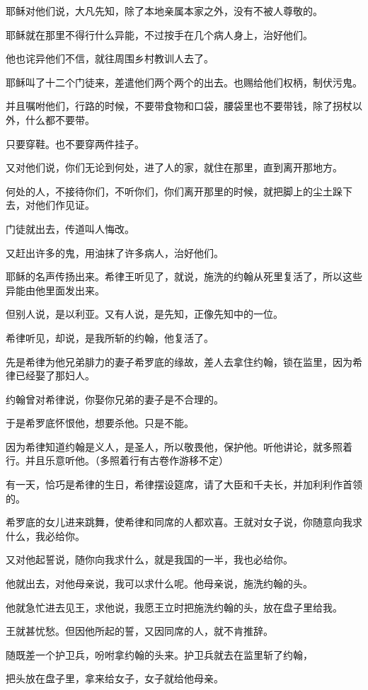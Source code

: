 \documentclass[12pt,oneside]{book}
\begin{document}
耶稣对他们说，大凡先知，除了本地亲属本家之外，没有不被人尊敬的。

耶稣就在那里不得行什么异能，不过按手在几个病人身上，治好他们。

他也诧异他们不信，就往周围乡村教训人去了。

耶稣叫了十二个门徒来，差遣他们两个两个的出去。也赐给他们权柄，制伏污鬼。

并且嘱咐他们，行路的时候，不要带食物和口袋，腰袋里也不要带钱，除了拐杖以外，什么都不要带。

只要穿鞋。也不要穿两件挂子。

又对他们说，你们无论到何处，进了人的家，就住在那里，直到离开那地方。

何处的人，不接待你们，不听你们，你们离开那里的时候，就把脚上的尘土跺下去，对他们作见证。

门徒就出去，传道叫人悔改。

又赶出许多的鬼，用油抹了许多病人，治好他们。

耶稣的名声传扬出来。希律王听见了，就说，施洗的约翰从死里复活了，所以这些异能由他里面发出来。

但别人说，是以利亚。又有人说，是先知，正像先知中的一位。

希律听见，却说，是我所斩的约翰，他复活了。

先是希律为他兄弟腓力的妻子希罗底的缘故，差人去拿住约翰，锁在监里，因为希律已经娶了那妇人。

约翰曾对希律说，你娶你兄弟的妻子是不合理的。

于是希罗底怀恨他，想要杀他。只是不能。

因为希律知道约翰是义人，是圣人，所以敬畏他，保护他。听他讲论，就多照着行。并且乐意听他。（多照着行有古卷作游移不定）

有一天，恰巧是希律的生日，希律摆设筵席，请了大臣和千夫长，并加利利作首领的。

希罗底的女儿进来跳舞，使希律和同席的人都欢喜。王就对女子说，你随意向我求什么，我必给你。

又对他起誓说，随你向我求什么，就是我国的一半，我也必给你。

他就出去，对他母亲说，我可以求什么呢。他母亲说，施洗约翰的头。

他就急忙进去见王，求他说，我愿王立时把施洗约翰的头，放在盘子里给我。

王就甚忧愁。但因他所起的誓，又因同席的人，就不肯推辞。

随既差一个护卫兵，吩咐拿约翰的头来。护卫兵就去在监里斩了约翰，

把头放在盘子里，拿来给女子，女子就给他母亲。
\end{document}
